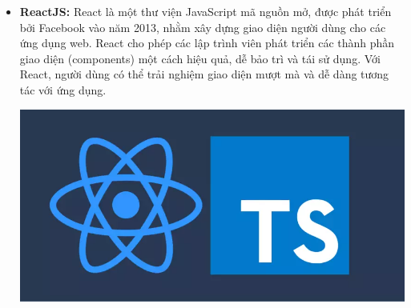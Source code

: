 \begin{itemize}
    \item \textbf{ReactJS:} React là một thư viện JavaScript mã nguồn mở, được phát triển bởi Facebook vào năm 2013, nhằm xây dựng giao diện người dùng cho các ứng dụng web. React cho phép các lập trình viên phát triển các thành phần giao diện (components) một cách hiệu quả, dễ bảo trì và tái sử dụng. Với React, người dùng có thể trải nghiệm giao diện mượt mà và dễ dàng tương tác với ứng dụng.
    
    \includegraphics[width=\textwidth]{img/react.png}
\end{itemize}

